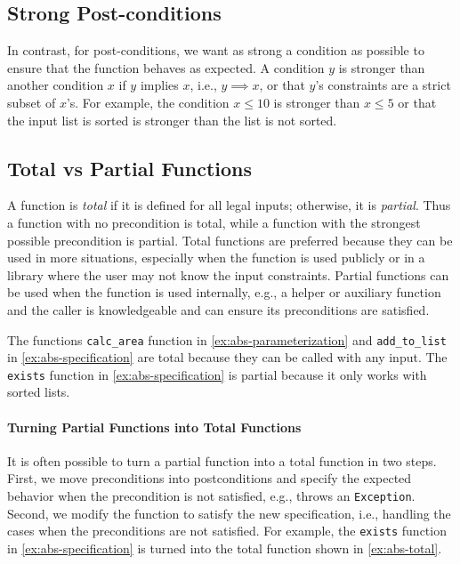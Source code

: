 \documentclass[oneside,11pt,dvipsnames]{book}
\newcommand{\code}[1]{\texttt{#1}}
\begin{document}
\subsection{Strong Post-conditions}

In contrast, for post-conditions, we want as strong a condition as possible to ensure that the function behaves as expected. A condition $y$ is stronger than another condition $x$ if $y$ implies $x$, i.e., $y \implies x$, or that $y$'s constraints are a strict subset of $x$'s. For example, the condition $x \le 10$ is stronger than $x \le 5$ or that the input list is sorted is stronger than the list is not sorted.


\subsection{Total vs Partial Functions}

A function is \emph{total} if it is defined for all legal inputs; otherwise, it is \emph{partial}. Thus a function with no precondition is total, while a function with the strongest possible precondition is partial.  Total functions are preferred because they can be used in more situations, especially when the function is used publicly or in a library where the user may not know the input constraints. Partial functions can be used when the function is used internally, e.g., a helper or auxiliary function and the caller is knowledgeable and can ensure its preconditions are satisfied.

The functions \code{calc\_area} function in \autoref{ex:abs-parameterization} and \code{add\_to\_list} in \autoref{ex:abs-specification} are total because they can be called with any input. The \code{exists} function in \autoref{ex:abs-specification} is partial because it only works with sorted lists.


\paragraph{Turning Partial Functions into Total Functions} It is often possible to turn a partial function into a total function in two steps. First, we move preconditions into postconditions and specify the expected behavior when the precondition is not satisfied, e.g., throws an \code{Exception}. Second, we modify the function to satisfy the new specification, i.e., handling the cases when the preconditions are not satisfied. For example, the \code{exists} function in \autoref{ex:abs-specification} is turned into the total function shown in \autoref{ex:abs-total}.
\end{document}
